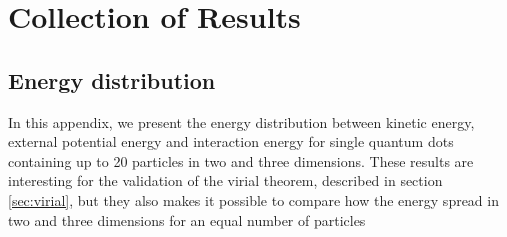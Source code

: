 \chapter{Collection of Results} \label{chp:totalresults}

\section{Energy distribution} \label{sec:energydistribution}
In this appendix, we present the energy distribution between kinetic energy, external potential energy and interaction energy for single quantum dots containing up to 20 particles in two and three dimensions. These results are interesting for the validation of the virial theorem, described in section \ref{sec:virial}, but they also makes it possible to compare how the energy spread in two  and three dimensions for an equal number of particles 

